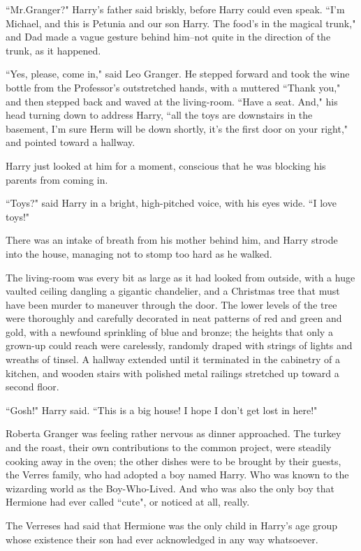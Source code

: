 ``Mr.\?Granger?" Harry's father said briskly, before Harry could even speak. ``I'm Michael, and this is Petunia and our son Harry. The food's in the magical trunk," and Dad made a vague gesture behind him\---not quite in the direction of the trunk, as it happened.

``Yes, please, come in," said Leo Granger. He stepped forward and took the wine bottle from the Professor's outstretched hands, with a muttered ``Thank you," and then stepped back and waved at the living-room. ``Have a seat. And," his head turning down to address Harry, ``all the toys are downstairs in the basement, I'm sure Herm will be down shortly, it's the first door on your right," and pointed toward a hallway.

Harry just looked at him for a moment, conscious that he was blocking his parents from coming in.

``Toys?" said Harry in a bright, high-pitched voice, with his eyes wide. ``I love toys!"

There was an intake of breath from his mother behind him, and Harry strode into the house, managing not to stomp too hard as he walked.

The living-room was every bit as large as it had looked from outside, with a huge vaulted ceiling dangling a gigantic chandelier, and a Christmas tree that must have been murder to maneuver through the door. The lower levels of the tree were thoroughly and carefully decorated in neat patterns of red and green and gold, with a newfound sprinkling of blue and bronze; the heights that only a grown-up could reach were carelessly, randomly draped with strings of lights and wreaths of tinsel. A hallway extended until it terminated in the cabinetry of a kitchen, and wooden stairs with polished metal railings stretched up toward a second floor.

``Gosh!" Harry said. ``This is a big house! I hope I don't get lost in here!"

\later

Roberta Granger was feeling rather nervous as dinner approached. The turkey and the roast, their own contributions to the common project, were steadily cooking away in the oven; the other dishes were to be brought by their guests, the Verres family, who had adopted a boy named Harry. Who was known to the wizarding world as the Boy-Who-Lived. And who was also the only boy that Hermione had ever called ``cute", or noticed at all, really.

The Verreses had said that Hermione was the only child in Harry's age group whose existence their son had ever acknowledged in any way whatsoever.

